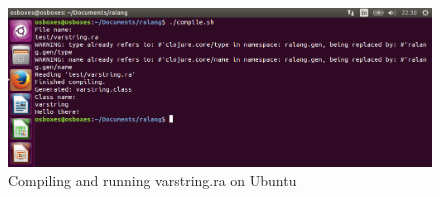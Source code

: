 \documentclass[a4paper]{article}
\begin{document}
\begin{appendices}
\begin{figure}[h!]
		\label{fig:ubuntu_vars}
	\end{figure}
	\begin{figure}[h!]
		\centering
		\includegraphics[width=\linewidth]{images/ubuntu_varstring.png}
		\caption[Compiling and running varstring.ra on Ubuntu 15.10 64-bit]{Compiling and running varstring.ra on Ubuntu}
		\label{fig:ubuntu_varstring}
	\end{figure}
	\newpage

\end{appendices}
\end{document}
